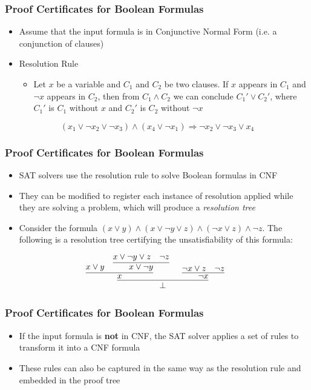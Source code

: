 \documentclass[usepdftitle=false,aspectratio=169,usenames,dvipsnames]{beamer}
\newcommand\vitem{\vfill\item}
\begin{document}
\begin{frame}
  \frametitle{Proof Certificates for Boolean Formulas}
    \begin{itemize}
    \item Assume that the input formula is in Conjunctive Normal Form (i.e. a conjunction of clauses)
    \vitem Resolution Rule
    \begin{itemize}
      \item Let $x$ be a variable and $C_{1}$ and $C_{2}$ be two clauses. If $x$ appears in $C_{1}$ and $\neg x$ appears in $C_{2}$, then from $C_{1} \wedge C_{2}$ we can conclude $C_{1}' \vee C_{2}'$, where $C_{1}'$ is $C_{1}$ without $x$ and $C_{2}'$ is $C_{2}$ without $\neg x$
    \end{itemize}
  \end{itemize}
          \vfill
          $$ (x_{1} \vee \neg x_{2} \vee \neg x_{3}) \wedge (x_{4} \vee \neg x_{1}) \Rightarrow \neg x_{2} \vee \neg x_{3} \vee x_{4} $$
\end{frame}

\begin{frame}
  \frametitle{Proof Certificates for Boolean Formulas}
  \begin{itemize}
    \item SAT solvers use the resolution rule to solve Boolean formulas in CNF
    \vitem They can be modified to register each instance of resolution applied while they are solving a problem, which will produce a \textit{resolution tree}
    \vitem Consider the formula $(x \vee y) \wedge (x \vee \neg y \vee z) \wedge (\neg x \vee z) \wedge  \neg z$. The following is a resolution tree certifying the unsatisfiability of this formula:
  \end{itemize}
  \vfill
  \[
\infer[]{\bot}{
  \infer[]
  {x}
  {x \vee y & \infer[]{x \vee \neg y}{x \vee \neg y \vee z & \neg z}} & \infer[]{\neg x}{\neg x \vee z & \neg z}}
\]
\end{frame}

\begin{frame}
  \frametitle{Proof Certificates for Boolean Formulas}
  \begin{itemize}
    \item If the input formula is \textbf{not} in CNF, the SAT solver applies a set of rules to transform it into a CNF formula
    \vitem These rules can also be captured in the same way as the resolution rule and embedded in the proof tree
  \end{itemize}
\end{frame}
\end{document}
